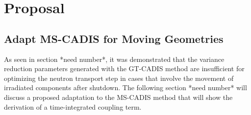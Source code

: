 \chapter{Proposal}\label{ch:proposal}

\section{Adapt MS-CADIS for Moving Geometries}\label{sec:adapt}
As seen in section *need number*, it was demonstrated that the variance
reduction parameters generated with the GT-CADIS method are insufficient for
optimizing the neutron transport step in cases that involve the movement 
of irradiated components after shutdown.  
The following section *need number* will discuss a proposed adaptation to the
MS-CADIS method that will show the derivation of a time-integrated coupling
term.

